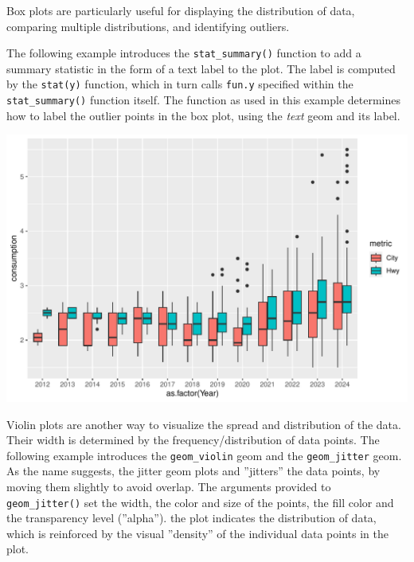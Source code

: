 Box plots are particularly useful for displaying the distribution of data, comparing multiple distributions, and identifying outliers.

The following example introduces the \texttt{stat\_summary()} function to add a summary statistic in the form of a text label to the plot. The label is computed by the \texttt{stat(y)} function, which in turn calls \texttt{fun.y} specified within the \texttt{stat\_summary()} function itself. The function as used in this example determines how to label the outlier points in the box plot, using the \emph{text} geom and its label.


\begin{center}
  \includegraphics[width=.8\textwidth]{fuel.box.pdf}
\end{center}

Violin plots are another way to visualize the spread and distribution of the data. Their width is determined by the frequency/distribution of data points. The following example introduces the \texttt{geom\_violin} geom and the \texttt{geom\_jitter} geom. As the name suggests, the jitter geom plots and ''jitters'' the data points, by moving them slightly to avoid overlap. The arguments provided to \texttt{geom\_jitter()} set the width, the color and size of the points, the fill color and the transparency level (''alpha''). the plot indicates the distribution of data, which is reinforced by the visual ''density'' of the individual data points in the plot.

